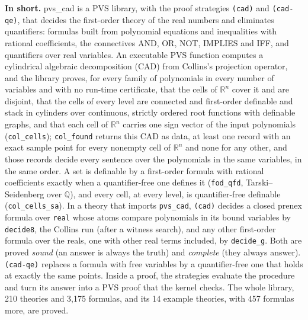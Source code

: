 \documentclass[11pt]{article}
\begin{document}
\textbf{In short.} pvs\_cad is a PVS library, with the proof strategies \texttt{(cad)} and \texttt{(cad-qe)}, that
decides the first-order theory of the real numbers and eliminates quantifiers: formulas built from polynomial equations
and inequalities with rational coefficients, the connectives AND, OR, NOT, IMPLIES and IFF, and quantifiers over real
variables. An executable PVS function computes a cylindrical algebraic decomposition (CAD) from Collins's projection
operator, and the library proves, for every family of polynomials in every number of variables and with
no run-time certificate, that the cells of $\mathbb{R}^n$ cover it and are disjoint, that the cells of every level are
connected and first-order definable and stack in cylinders over continuous, strictly ordered root functions with
definable graphs, and that each cell of $\mathbb{R}^n$ carries one sign vector of the input polynomials
(\texttt{col\_cells}); \texttt{col\_found} returns this CAD as data, at least one record with an exact sample point for
every nonempty cell of $\mathbb{R}^n$ and none for any other, and those records decide every sentence over the
polynomials in the same variables, in the same order. A set is definable by a first-order formula with rational coefficients
exactly when a quantifier-free one defines it (\texttt{fod\_qfd}, Tarski--Seidenberg over $\mathbb{Q}$), and every cell,
at every level, is quantifier-free definable (\texttt{col\_cells\_sa}). In a theory that imports
\texttt{pvs\_cad}, \texttt{(cad)} decides a closed prenex formula over \texttt{real} whose atoms compare polynomials in its
bound variables by \texttt{decide8}, the Collins run (after a witness search), and any other first-order formula over the
reals, one with other real terms included, by \texttt{decide\_g}.
Both are proved \emph{sound} (an answer is always the truth) and \emph{complete} (they always answer).
\texttt{(cad-qe)} replaces a formula with free variables by a quantifier-free one that holds at exactly the same points.
Inside a proof, the strategies evaluate the procedure and turn its answer into a PVS proof that the kernel checks. The
whole library, 210 theories and 3,175 formulas, and its 14 example theories, with 457 formulas more, are proved.
\end{document}
